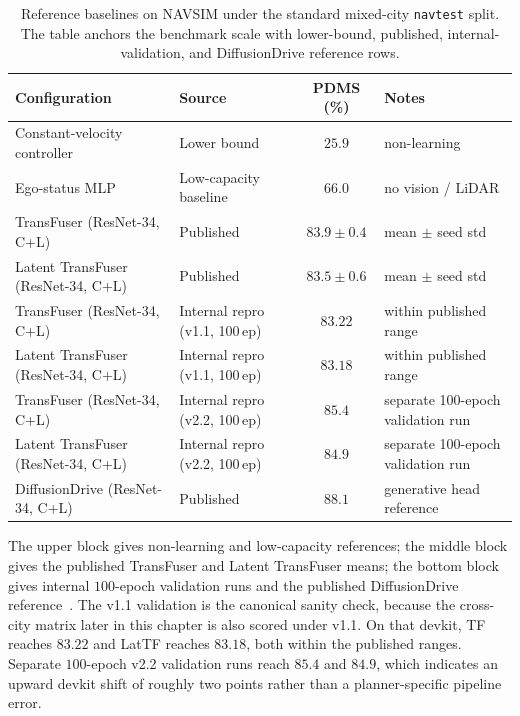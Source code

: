 \begin{table}[H]
\centering
\caption[Reference baselines on NAVSIM (mixed-city split).]{Reference baselines on NAVSIM under the standard mixed-city \texttt{navtest} split. The table anchors the benchmark scale with lower-bound, published, internal-validation, and DiffusionDrive reference rows.}
\label{tab:baselines}
\small
\renewcommand{\arraystretch}{1.15}
\setlength{\tabcolsep}{6pt}
\begin{tabular}{@{}>{\raggedright\arraybackslash}p{5.4cm} >{\raggedright\arraybackslash}p{3.2cm} c >{\raggedright\arraybackslash}p{2.7cm}@{}}
\toprule
\textbf{Configuration} & \textbf{Source} & \textbf{PDMS (\%)} & \textbf{Notes} \\
\midrule
Constant-velocity controller                         & Lower bound                        & $25.9$             & non-learning \\
Ego-status MLP                                       & Low-capacity baseline              & $66.0$             & no vision / LiDAR \\
\midrule
TransFuser (ResNet-34, C+L)                          & Published~\cite{dauner-navsim-2024} & $83.9 \pm 0.4$     & mean $\pm$ seed std \\
Latent TransFuser (ResNet-34, C+L)                   & Published~\cite{dauner-navsim-2024} & $83.5 \pm 0.6$     & mean $\pm$ seed std \\
\midrule
TransFuser (ResNet-34, C+L)                          & Internal repro (v1.1, 100\,ep)     & $\mathbf{83.22}$   & within published range \\
Latent TransFuser (ResNet-34, C+L)                   & Internal repro (v1.1, 100\,ep)     & $\mathbf{83.18}$   & within published range \\
TransFuser (ResNet-34, C+L)                          & Internal repro (v2.2, 100\,ep)     & $\mathbf{85.4}$    & separate 100-epoch validation run \\
Latent TransFuser (ResNet-34, C+L)                   & Internal repro (v2.2, 100\,ep)     & $\mathbf{84.9}$    & separate 100-epoch validation run \\
DiffusionDrive (ResNet-34, C+L)                      & Published~\cite{jia-diffusiondrive-2025} & $88.1$       & generative head reference \\
\bottomrule
\end{tabular}
\end{table}

The upper block gives non-learning and low-capacity references; the middle block gives the published TransFuser and Latent TransFuser means; the bottom block gives internal $100$-epoch validation runs and the published DiffusionDrive reference~\cite{dauner-navsim-2024,jia-diffusiondrive-2025}. The v1.1 validation is the canonical sanity check, because the cross-city matrix later in this chapter is also scored under v1.1. On that devkit, TF reaches $83.22$ and LatTF reaches $83.18$, both within the published ranges. Separate $100$-epoch v2.2 validation runs reach $85.4$ and $84.9$, which indicates an upward devkit shift of roughly two points rather than a planner-specific pipeline error.

